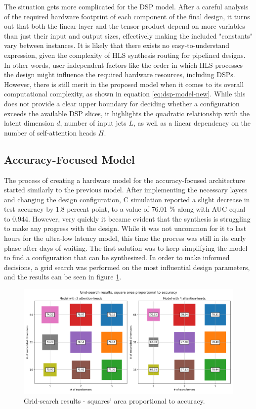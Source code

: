 The situation gets more complicated for the DSP model. After a careful analysis of the required hardware footprint of each component of the final design, it turns out that both the linear layer and the tensor product depend on more variables than just their input and output sizes, effectively making the included "constants" vary between instances. It is likely that there exists no easy-to-understand expression, given the complexity of HLS synthesis routing for pipelined designs. In other words, user-independent factors like the order in which HLS processes the design might influence the required hardware resources, including DSPs. However, there is still merit in the proposed model when it comes to its overall computational complexity, as shown in equation \ref{eq:dsp-model-new}. While this does not provide a clear upper boundary for deciding whether a configuration exceeds the available DSP slices, it highlights the quadratic relationship with the latent dimension \(d\), number of input jets \(L\), as well as a linear dependency on the number of self-attention heads \(H\).

\subsection{Accuracy-Focused Model}
The process of creating a hardware model for the accuracy-focused architecture started similarly to the previous model. After implementing the necessary layers and changing the design configuration, C simulation reported a slight decrease in test accuracy by 1.8 percent point, to a value of 76.01 \% along with AUC equal to 0.944. However, very quickly it became evident that the synthesis is struggling to make any progress with the design. While it was not uncommon for it to last hours for the ultra-low latency model, this time the process was still in its early phase after days of waiting. The first solution was to keep simplifying the model to find a configuration that can be synthesized. In order to make informed decisions, a grid search was performed on the most influential design parameters, and the results can be seen in figure \ref{fig:grid-search}.

\begin{figure}[hpt!]
  \centering
  \includegraphics[trim={0cm 0cm 0cm 0cm}, clip, width=1.0\textwidth, center]{../logs/grid_search.png}
  \caption{Grid-search results - squares' area proportional to accuracy.}
  \label{fig:grid-search}
\end{figure}

